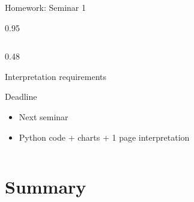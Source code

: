 \documentclass[9pt, aspectratio=169, t]{beamer}
\begin{document}
\begin{frame}[shrink=5]{Homework: Seminar 1}
\begin{cminipage}{0.95\textwidth}
\begin{columns}[T]
\begin{column}{0.48\textwidth}
\begin{block}{Interpretation requirements}
    \end{block}
    \vspace{0.05cm}
    \begin{alertblock}{Deadline}
    \begin{itemize}\setlength{\itemsep}{0pt}
        \item Next seminar
        \item Python code + charts + 1 page interpretation
    \end{itemize}
    \end{alertblock}
    \end{column}
    \end{columns}
    \end{cminipage}
\end{frame}

\section{Summary}
\end{document}
